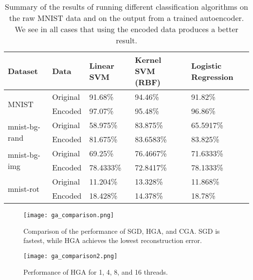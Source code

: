 \begin{table}[h]
	\centering
\begin{tabular}{ll|lll}
    Dataset                        & Data               & Linear SVM & Kernel SVM (RBF) & Logistic Regression \\ \hline
    \multirow{2}{*}{MNIST}         & Original           & 91.68\%    & 94.46\%          & 91.82\%             \\
                                   & Encoded            & 97.07\%    & 95.48\%          & 96.86\%             \\ \hline
    \multirow{2}{*}{mnist-bg-rand} & Original           & 58.975\%   & 83.875\%         & 65.5917\%           \\
                                   & Encoded            & 81.675\%   & 83.6583\%        & 83.825\%            \\ \hline
    \multirow{2}{*}{mnist-bg-img}  & Original           & 69.25\%    & 76.4667\%        & 71.6333\%           \\
                                   & Encoded            & 78.4333\%  & 72.8417\%        & 78.1333\%           \\ \hline
    \multirow{2}{*}{mnist-rot}     & Original           & 11.204\%   & 13.328\%         & 11.868\%           \\
                                   & Encoded            & 18.428\%   & 14.378\%         & 18.78\%
\end{tabular}
	\label{tab:classvsenc}
	\caption{Summary of the results of running different classification algorithms on the raw MNIST data and on the output from a trained autoencoder. We
	see in all cases that using the encoded data produces a better result.}
\end{table}





\begin{figure}[h] \centering
	\texttt{[image: ga\_comparison.png]}
	\caption{Comparison of the performance of SGD, HGA, and CGA. SGD is fastest, while HGA achieves the lowest reconstruction error.}
	\label{fig:ga_comparison}
\end{figure}

\begin{figure}[h] \centering
	\texttt{[image: ga\_comparison2.png]}
	\caption{Performance of HGA for 1, 4, 8, and 16 threads.}
	\label{fig:ga_comparison2}
\end{figure}

